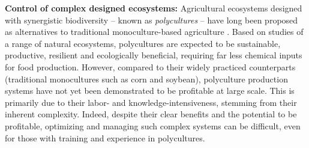 \textbf{Control of complex designed ecosystems:}   Agricultural ecosystems designed with synergistic biodiversity -- known as \textit{polycultures} -- have long been proposed as alternatives to traditional monoculture-based agriculture \cite{dewar2007perennial,lin2011resilience,thrupp2000linking,letourneau2011does}. Based on studies of a range of natural ecosystems, polycultures are expected to be sustainable, productive, resilient and ecologically beneficial, requiring far less chemical inputs for food production. However, compared to their widely practiced counterparts (traditional monocultures such as corn and soybean), polyculture production systems have not yet been demonstrated to be profitable at large scale. This is primarily %
due to their labor- and knowledge-intensiveness, stemming from their inherent complexity. Indeed, despite their clear benefits and the potential to be profitable, optimizing and managing such complex systems can be difficult, even for those with training and experience in polycultures. 


